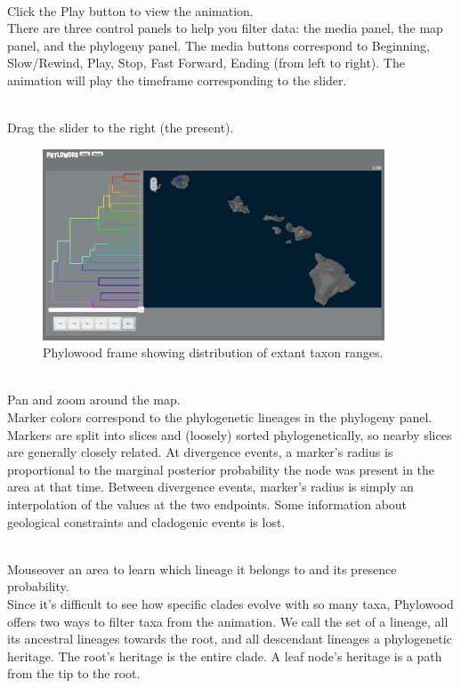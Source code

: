 \noindent \\ \impmark Click the Play button to view the animation. \\

There are three control panels to help you filter data: the media panel, the map panel, and the phylogeny panel.
The media buttons correspond to Beginning, Slow/Rewind, Play, Stop, Fast Forward, Ending (from left to right).
The animation will play the timeframe corresponding to the slider.

\noindent \\ \impmark Drag the slider to the right (the present).

\begin{figure}[H]
\centering
\includegraphics[width=4in]{figures/phw_all}
\caption{Phylowood frame showing distribution of extant taxon ranges.}
\end{figure}

\noindent \\ \impmark Pan and zoom around the map.\\

Marker colors correspond to the phylogenetic lineages in the phylogeny panel.
Markers are split into slices and (loosely) sorted phylogenetically, so nearby slices are generally closely related.
At divergence events, a marker's radius is proportional to the marginal posterior probability the node was present in the area at that time.
Between divergence events, marker's radius is simply an interpolation of the values at the two endpoints.
Some information about geological constraints and cladogenic events is lost.

\noindent \\ \impmark Mouseover an area to learn which lineage it belongs to and its presence probability. \\

Since it's difficult to see how specific clades evolve with so many taxa, Phylowood offers two ways to filter taxa from the animation.
We call the set of a lineage, all its ancestral lineages towards the root, and all descendant lineages a phylogenetic heritage.
The root's heritage is the entire clade.
A leaf node's heritage is a path from the tip to the root.

